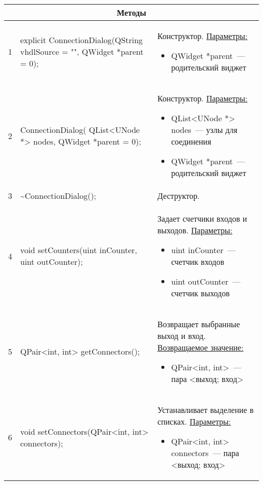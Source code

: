 \begin{longtable}[h]{|p{}|p{}|p{}|}
  \multicolumn{3}{|c|}{\textbf{Методы}} \\
  \hline
  1 & explicit ConnectionDialog(QString vhdlSource = "", QWidget *parent = 0); &
    Конструктор.\newline
    \uline{Параметры:}
    \begin{itemize}[nolistsep,label=,leftmargin=0cm]
      \item QWidget *parent~--- родительский виджет
    \end{itemize}\\ \hline
  2 & ConnectionDialog( QList<UNode *> nodes, QWidget *parent = 0); &
    Конструктор.\newline
    \uline{Параметры:}
    \begin{itemize}[nolistsep,label=,leftmargin=0cm]
      \item QList<UNode *> nodes~--- узлы для соединения
      \item QWidget *parent~--- родительский виджет
    \end{itemize}\\ \hline
  3 & \textasciitilde ConnectionDialog(); & Деструктор. \\ \hline
  4 & void setCounters(uint inCounter, uint outCounter); & Задает счетчики входов и выходов.\newline
    \uline{Параметры:}
    \begin{itemize}[nolistsep,label=,leftmargin=0cm]
      \item uint inCounter~--- счетчик входов
      \item uint outCounter~--- счетчик выходов
    \end{itemize}\\ \hline
  5 & QPair<int, int> getConnectors(); & Возвращает выбранные выход и вход.\newline
    \uline{Возвращаемое значение:}
    \begin{itemize}[nolistsep,label=,leftmargin=0cm]
      \item QPair<int, int>~--- пара <выход; вход>
    \end{itemize}\\ \hline
  6 & void setConnectors(QPair<int, int> connectors); & Устанавливает выделение в списках.\newline
    \uline{Параметры:}
    \begin{itemize}[nolistsep,label=,leftmargin=0cm]
      \item QPair<int, int> connectors~--- пара <выход; вход>
    \end{itemize}\\ \hline

\end{longtable}
